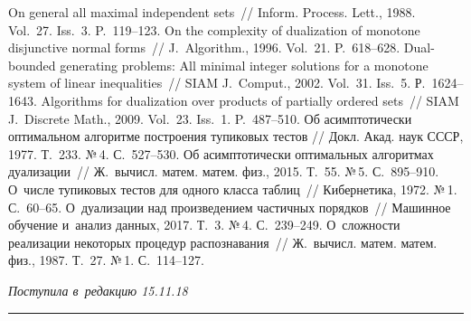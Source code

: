 \begin{multicols}{2}
  
  {\small\frenchspacing
 {%
 \begin{thebibliography}{9}
      On general all maximal 
independent sets~// Inform. Process. Lett., 1988. Vol.~27. Iss.~3. P.~119--123.
      On the complexity of dualization of monotone disjunctive 
normal forms~// J.~Algorithm., 1996. Vol.~21. P.~618--628.
      Dual-bounded 
generating problems: All minimal integer solutions for a monotone system of linear inequalities~// 
SIAM J.~Comput., 2002. Vol.~31. Iss.~5. Р.~1624--1643. 
      Algorithms for dualization over products of partially ordered sets~// 
SIAM J.~Discrete Math., 2009. Vol.~23. Iss.~1. P.~487--510.
      Об асимптотически оптимальном алгоритме построения тупиковых 
тестов // Докл. Акад. наук СССР, 1977. Т.~233. №\,4. С.~527--530.
      Об асимптотически оптимальных алгоритмах 
дуализации~// Ж.~вычисл. матем. матем. физ., 2015. Т.~55. №\,5. 
С.~895--910.
      О~числе тупиковых тестов для одного класса 
таблиц~// Кибернетика, 1972. №\,1. С.~60--65.
      О~дуализации над 
произведением частичных порядков~// Машинное обучение и~анализ данных, 2017. Т.~3. 
№\,4. С.~239--249.
      О~сложности реализации некоторых процедур распознавания~// 
Ж.~вычисл. матем. матем. физ., 1987. Т.~27. №\,1. С.~114--127.
 \end{thebibliography}

 }
 }

\end{multicols}

\vspace*{-3pt}

\hfill{\small\textit{Поступила в~редакцию 15.11.18}}

\vspace*{8pt}




\hrule

